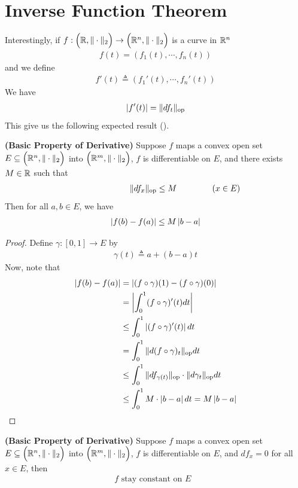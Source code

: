 \documentclass{report}
\begin{document}
\section{Inverse Function Theorem}
\begin{mdframed}
Interestingly, if $f:\Big(\mathbb{R},\| \cdot \|_2 \Big)\rightarrow \Big(\mathbb{R}^n , \| \cdot \|_2\Big)$ is a curve in $\mathbb{R}^n$ 
\begin{align*}
f(t)=(f_1(t),\cdots , f_n(t))
\end{align*}
and we define 
\begin{align*}
f'(t)\triangleq (f_1'(t),\cdots ,f_n'(t))
\end{align*}
We have 
\begin{align*}
\left|f'(t)\right|= \| df_t \|_{\text{op}}
\end{align*}
This give us the following expected result (). 
\end{mdframed}
\begin{theorem}
\label{BPoDB}
\textbf{(Basic Property of Derivative)} Suppose $f$ maps a convex open set $E\subseteq \Big(\mathbb{R}^n,\| \cdot \|_2 \Big)$ into $\Big(\mathbb{R}^m,\| \cdot \|_2 \Big)$,  $f$ is differentiable on $E$, and there exists $M\in\mathbb{R}$ such that 
\begin{align*}
\hspace{2.5cm}\| df_x \|_\text{op}\leq M\hspace{1.5cm}(x \in E)
\end{align*}
Then for all $a,b \in E$, we have
\begin{align*}
\left|f(b)-f(a)\right|\leq M \left|b-a\right|
\end{align*}
\end{theorem}
\begin{proof}
Define $\gamma:[0,1]\rightarrow E$ by 
\begin{align*}
\gamma (t)\triangleq a+(b-a)t
\end{align*}
Now, note that 
\begin{align*}
\left|f(b)-f(a)\right|&= \left|(f\circ \gamma )(1)-(f\circ \gamma )(0)\right|\\
&= \left|\int_0^ 1(f\circ \gamma )'(t)dt\right|\\
&\leq \int_0^1 \left|(f\circ \gamma )'(t)\right|dt\\
&=\int_0^1 \| d(f\circ \gamma )_t \|_\text{op}dt\\
&\leq \int_0^1 \| df_{\gamma (t)} \|_\text{op}\cdot \| d\gamma_t \|_\text{op}dt\\
&\leq \int_0^1 M\cdot \left|b-a\right|dt=M\left|b-a\right|
\end{align*}
\end{proof}
\begin{corollary}
\label{BPoD}
\textbf{(Basic Property of Derivative)} Suppose $f$ maps a convex open set $E\subseteq \Big(\mathbb{R}^n,\| \cdot \|_2 \Big)$ into $\Big(\mathbb{R}^m,\| \cdot \|_2 \Big)$, $f$ is differentiable on $E$, and $df_x=0$ for all $x\in E$, then
\begin{align*}
f\text{ stay constant on $E$ }
\end{align*}
\end{corollary}
\end{document}
